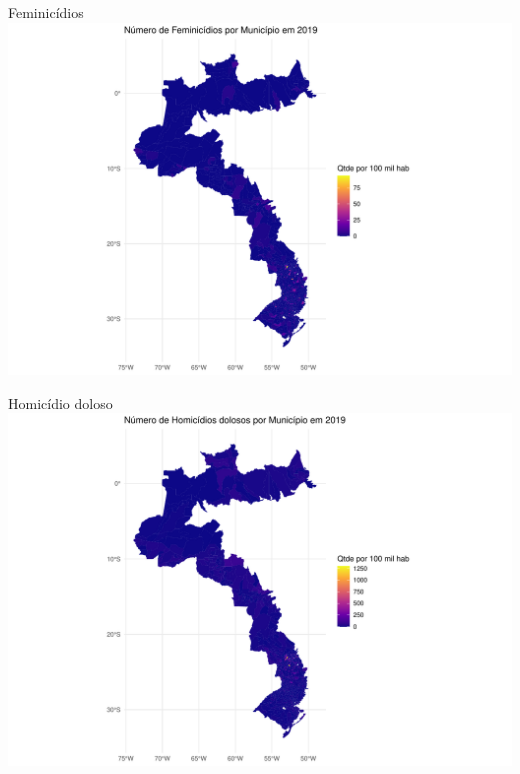 \documentclass[
  ignorenonframetext,
]{beamer}
\begin{document}
\begin{frame}{Feminicídios}
\label{feminicuxeddios}
\includegraphics{graficos_files/figure-beamer/unnamed-chunk-19-1.pdf}
\end{frame}

\begin{frame}{Homicídio doloso}
\label{homicuxeddio-doloso}
\includegraphics{graficos_files/figure-beamer/unnamed-chunk-20-1.pdf}
\end{frame}
\end{document}
